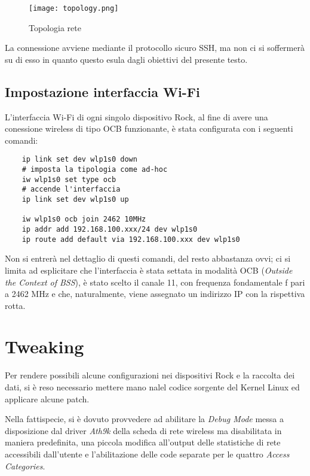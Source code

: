 \begin{figure}[h!]
    \centering
    \texttt{[image: topology.png]}
    \caption{Topologia rete}
    \label{fig:etichetta}
\end{figure}

La connessione avviene mediante il protocollo sicuro SSH, ma non ci si soffermerà su di esso in quanto questo esula dagli obiettivi del presente testo.

\subsection[Impostazione interfaccia Wi-Fi]{Impostazione interfaccia Wi-Fi}
L'interfaccia Wi-Fi di ogni singolo dispositivo Rock, al fine di avere una conessione wireless di tipo OCB funzionante, è stata configurata con i seguenti comandi:

\begin{lstlisting}
    ip link set dev wlp1s0 down
    # imposta la tipologia come ad-hoc
    iw wlp1s0 set type ocb
    # accende l'interfaccia
    ip link set dev wlp1s0 up
    
    iw wlp1s0 ocb join 2462 10MHz
    ip addr add 192.168.100.xxx/24 dev wlp1s0
    ip route add default via 192.168.100.xxx dev wlp1s0
\end{lstlisting}

Non si entrerà nel dettaglio di questi comandi, del resto abbastanza ovvi; ci si limita ad esplicitare che l'interfaccia è stata settata in modalità OCB (\textit{Outside the Context of BSS}), è stato scelto il canale 11, con frequenza fondamentale f pari a 2462 MHz e che, naturalmente, viene assegnato un indirizzo IP con la rispettiva rotta.

\section{Tweaking}
Per rendere possibili alcune configurazioni nei dispositivi Rock e la raccolta dei dati, si è reso necessario mettere mano nalel codice sorgente del Kernel Linux ed applicare alcune patch.

Nella fattispecie, si è dovuto provvedere ad abilitare la \textit{Debug Mode} messa a disposizione dal driver \textit{Ath9k} della scheda di rete wireless ma disabilitata in maniera predefinita, una piccola modifica all'output delle statistiche di rete accessibili dall'utente e l'abilitazione delle code separate per le quattro \textit{Access Categories}.

